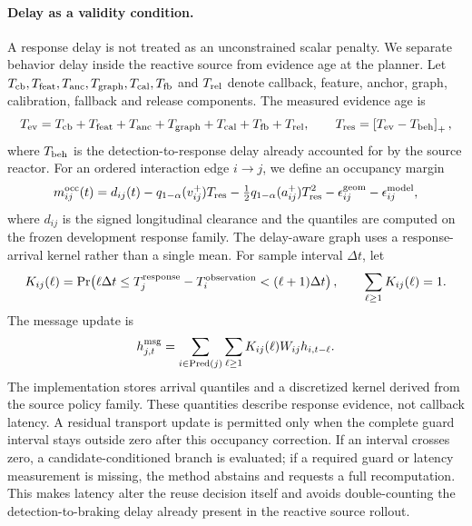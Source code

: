 \documentclass[10pt]{article}
\begin{document}
\paragraph{Delay as a validity condition.}
A response delay is not treated as an unconstrained scalar penalty.  We
separate behavior delay inside the reactive source from evidence age at the
planner.  Let $T_{\rm cb},T_{\rm feat},T_{\rm anc},T_{\rm graph},T_{\rm cal},
T_{\rm fb}$ and $T_{\rm rel}$ denote callback, feature, anchor, graph,
calibration, fallback and release components.  The measured evidence age is
\begin{equation}
 T_{\rm ev}=T_{\rm cb}+T_{\rm feat}+T_{\rm anc}+T_{\rm graph}+T_{\rm cal}
 +T_{\rm fb}+T_{\rm rel},\qquad
 T_{\rm res}=\left[T_{\rm ev}-T_{\rm beh}\right]_+,
 \label{eq:latencydecomp}
\end{equation}
where $T_{\rm beh}$ is the detection-to-response delay already accounted for
by the source reactor.  For an ordered interaction edge $i\to j$, we define
an occupancy margin
\[
 m_{ij}^{\rm occ}(t)=d_{ij}(t)-q_{1-\alpha}(v_{ij}^{+})T_{\rm res}
 -\tfrac12 q_{1-\alpha}(a_{ij}^{+})T_{\rm res}^{2}
 -\epsilon_{ij}^{\rm geom}-\epsilon_{ij}^{\rm model},
\]
where $d_{ij}$ is the signed longitudinal clearance and the quantiles are
computed on the frozen development response family.  The delay-aware graph
uses a response-arrival kernel rather than a single mean.  For sample interval
$\Delta t$, let
\begin{equation}
 K_{ij}(\ell)=\Pr\!\left(\ell\Delta t\le
 T_{j}^{\rm response}-T_{i}^{\rm observation}< (\ell+1)\Delta t\right),
 \qquad \sum_{\ell\ge1}K_{ij}(\ell)=1.
 \label{eq:delaykernel}
\end{equation}
The message update is
\begin{equation}
 h_{j,t}^{\rm msg}=\sum_{i\in\operatorname{Pred}(j)}\sum_{\ell\ge1}
 K_{ij}(\ell)W_{ij}h_{i,t-\ell}.
 \label{eq:kerneltransport}
\end{equation}
The implementation stores arrival quantiles and a discretized kernel derived
from the source policy family.  These quantities describe response evidence,
not callback latency.
A residual transport update is permitted only when the complete guard interval
stays outside zero after this occupancy correction.  If an interval crosses
zero, a candidate-conditioned branch is evaluated; if a required guard or
latency measurement is missing, the method abstains and requests a full
recomputation.  This makes latency alter the reuse decision itself and avoids
double-counting the detection-to-braking delay already present in the reactive
source rollout.
\end{document}
